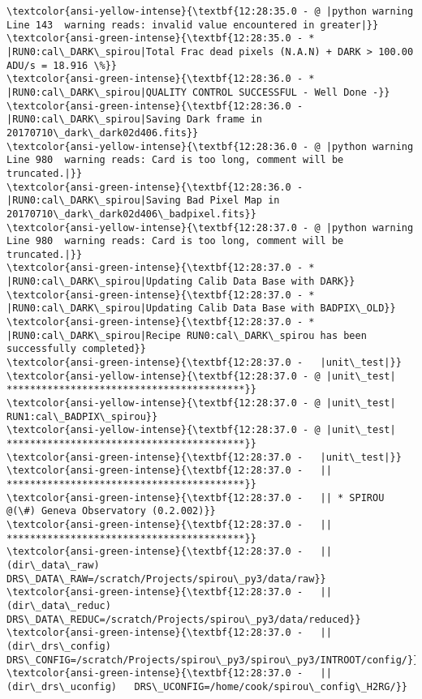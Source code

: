 \documentclass[11pt]{article}
\begin{document}
\begin{Verbatim}[commandchars=\\\{\}]
\textcolor{ansi-yellow-intense}{\textbf{12:28:35.0 - @ |python warning Line 143  warning reads: invalid value encountered in greater|}}
\textcolor{ansi-green-intense}{\textbf{12:28:35.0 - * |RUN0:cal\_DARK\_spirou|Total Frac dead pixels (N.A.N) + DARK > 100.00 ADU/s = 18.916 \%}}
\textcolor{ansi-green-intense}{\textbf{12:28:36.0 - * |RUN0:cal\_DARK\_spirou|QUALITY CONTROL SUCCESSFUL - Well Done -}}
\textcolor{ansi-green-intense}{\textbf{12:28:36.0 -   |RUN0:cal\_DARK\_spirou|Saving Dark frame in 20170710\_dark\_dark02d406.fits}}
\textcolor{ansi-yellow-intense}{\textbf{12:28:36.0 - @ |python warning Line 980  warning reads: Card is too long, comment will be truncated.|}}
\textcolor{ansi-green-intense}{\textbf{12:28:36.0 -   |RUN0:cal\_DARK\_spirou|Saving Bad Pixel Map in 20170710\_dark\_dark02d406\_badpixel.fits}}
\textcolor{ansi-yellow-intense}{\textbf{12:28:37.0 - @ |python warning Line 980  warning reads: Card is too long, comment will be truncated.|}}
\textcolor{ansi-green-intense}{\textbf{12:28:37.0 - * |RUN0:cal\_DARK\_spirou|Updating Calib Data Base with DARK}}
\textcolor{ansi-green-intense}{\textbf{12:28:37.0 - * |RUN0:cal\_DARK\_spirou|Updating Calib Data Base with BADPIX\_OLD}}
\textcolor{ansi-green-intense}{\textbf{12:28:37.0 - * |RUN0:cal\_DARK\_spirou|Recipe RUN0:cal\_DARK\_spirou has been successfully completed}}
\textcolor{ansi-green-intense}{\textbf{12:28:37.0 -   |unit\_test|}}
\textcolor{ansi-yellow-intense}{\textbf{12:28:37.0 - @ |unit\_test| *****************************************}}
\textcolor{ansi-yellow-intense}{\textbf{12:28:37.0 - @ |unit\_test| RUN1:cal\_BADPIX\_spirou}}
\textcolor{ansi-yellow-intense}{\textbf{12:28:37.0 - @ |unit\_test| *****************************************}}
\textcolor{ansi-green-intense}{\textbf{12:28:37.0 -   |unit\_test|}}
\textcolor{ansi-green-intense}{\textbf{12:28:37.0 -   || *****************************************}}
\textcolor{ansi-green-intense}{\textbf{12:28:37.0 -   || * SPIROU @(\#) Geneva Observatory (0.2.002)}}
\textcolor{ansi-green-intense}{\textbf{12:28:37.0 -   || *****************************************}}
\textcolor{ansi-green-intense}{\textbf{12:28:37.0 -   ||(dir\_data\_raw)      DRS\_DATA\_RAW=/scratch/Projects/spirou\_py3/data/raw}}
\textcolor{ansi-green-intense}{\textbf{12:28:37.0 -   ||(dir\_data\_reduc)    DRS\_DATA\_REDUC=/scratch/Projects/spirou\_py3/data/reduced}}
\textcolor{ansi-green-intense}{\textbf{12:28:37.0 -   ||(dir\_drs\_config)    DRS\_CONFIG=/scratch/Projects/spirou\_py3/spirou\_py3/INTROOT/config/}}
\textcolor{ansi-green-intense}{\textbf{12:28:37.0 -   ||(dir\_drs\_uconfig)   DRS\_UCONFIG=/home/cook/spirou\_config\_H2RG/}}

\end{Verbatim}
\end{document}
